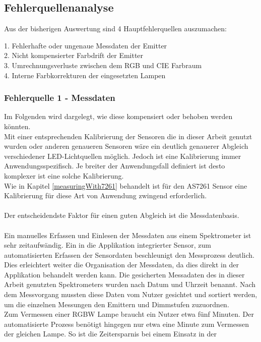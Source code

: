 \documentclass[11pt]{scrartcl}
\begin{document}
\subsection{Fehlerquellenanalyse}
Aus der bisherigen Auswertung sind 4 Hauptfehlerquellen auszumachen:
\begin{addmargin}[2em]{0em}
    1. Fehlerhafte oder ungenaue Messdaten der Emitter\\
    2. Nicht kompensierter Farbdrift der Emitter\\
    3. Umrechnungsverluste zwischen dem RGB und CIE Farbraum\\
    4. Interne Farbkorrekturen der eingesetzten Lampen
\end{addmargin}
\subsubsection{Fehlerquelle 1 - Messdaten}
Im Folgenden wird dargelegt, wie diese kompensiert oder behoben werden könnten.\\
Mit einer entsprechenden Kalibrierung der Sensoren die in dieser Arbeit genutzt wurden oder anderen genaueren
Sensoren wäre ein deutlich genauerer Abgleich verschiedener LED-Lichtquellen möglich. Jedoch ist eine
Kalibrierung immer Anwendungsspezifisch. Je breiter der Anwendungsfall definiert ist desto komplexer ist
eine solche Kalibrierung.\\
Wie in Kapitel \ref{measuringWith7261} behandelt ist für den AS7261 Sensor eine Kalibrierung für diese Art von
Anwendung zwingend erforderlich.\\
\\
Der entscheidendste Faktor für einen guten Abgleich ist die Messdatenbasis.\\
\\
Ein manuelles Erfassen und Einlesen der Messdaten aus einem Spektrometer ist sehr zeitaufwändig. Ein in die
Applikation integrierter Sensor, zum automatisierten Erfassen der Sensordaten beschleunigt den Messprozess
deutlich. Dies erleichtert weiter die Organisation der Messdaten, da dies direkt in der Applikation behandelt
werden kann. Die gesicherten Messadaten des in dieser Arbeit genutzten Spektrometers wurden nach Datum und
Uhrzeit benannt. Nach dem Messvorgang mussten diese Daten vom Nutzer gesichtet und sortiert werden, um die
einzelnen Messungen den Emittern und Dimmstufen zuzuordnen.\\
Zum Vermessen einer RGBW Lampe braucht ein Nutzer etwa fünf Minuten. Der automatisierte Prozess benötigt hingegen
nur etwa eine Minute zum Vermessen der gleichen Lampe. So ist die Zeitersparnis bei einem Einsatz in der
\end{document}
